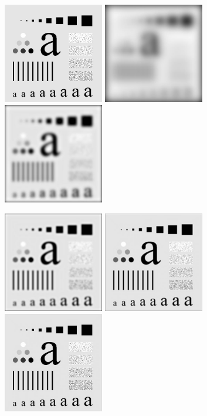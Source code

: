 \documentclass{article}
\begin{document}
\includegraphics[width=0.33\textwidth]{../data/characters_test_pattern.jpg}
\includegraphics[width=0.33\textwidth]{../data/butterworth_lowpass_10_characters_test_pattern.jpg}
\includegraphics[width=0.33\textwidth]{../data/butterworth_lowpass_30_characters_test_pattern.jpg}

\includegraphics[width=0.33\textwidth]{../data/butterworth_lowpass_60_characters_test_pattern.jpg}
\includegraphics[width=0.33\textwidth]{../data/butterworth_lowpass_160_characters_test_pattern.jpg}
\includegraphics[width=0.33\textwidth]{../data/butterworth_lowpass_460_characters_test_pattern.jpg}
\end{document}
